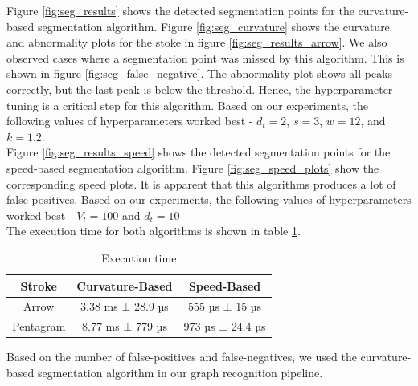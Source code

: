 Figure \ref{fig:seg_results} shows the detected segmentation points for the curvature-based segmentation algorithm. Figure \ref{fig:seg_curvature} shows the curvature and abnormality plots for the stoke in figure \ref{fig:seg_results_arrow}. We also observed cases where a segmentation point was missed by this algorithm. This is shown in figure \ref{fig:seg_false_negative}. The abnormality plot shows all peaks correctly, but the last peak is below the threshold. Hence, the hyperparameter tuning is a critical step for this algorithm. Based on our experiments, the following values of hyperparameters worked best - $d_t = 2$, $s = 3$, $w = 12$, and $k = 1.2$.\\

Figure \ref{fig:seg_results_speed} shows the detected segmentation points for the speed-based segmentation algorithm. Figure \ref{fig:seg_speed_plots} show the corresponding speed plots. It is apparent that this algorithms produces a lot of false-positives. Based on our experiments, the following values of hyperparameters worked best - $V_t = 100$ and $d_t = 10$\\

The execution time for both algorithms is shown in table \ref{table:exec_time}.

\begin{table}
	\centering
	\begin{tabular}{|c|c|c|}
		\hline
		Stroke & Curvature-Based & Speed-Based\\
		\hline
		Arrow & 3.38 ms ± 28.9 µs & 555 µs ± 15 µs\\
		\hline
		Pentagram & 8.77 ms ± 779 µs & 973 µs ± 24.4 µs\\
		\hline
	\end{tabular}
	\caption{Execution time}
	\label{table:exec_time}
\end{table}

Based on the number of false-positives and false-negatives, we used the curvature-based segmentation algorithm in our graph recognition pipeline.